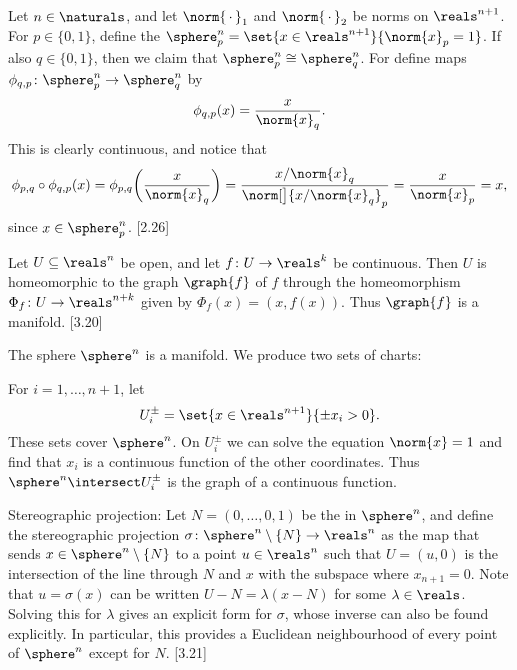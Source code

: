 \documentclass[article, a4paper, 11pt, oneside]{memoir}
\numberwithin{equation}{chapter}
\begin{document}
\begin{example}
    Let $n \in \naturals$, and let $\norm{\,\cdot\,}_1$ and $\norm{\,\cdot\,}_2$ be norms on $\reals^{n+1}$. For $p \in \{0,1\}$, define the  $\sphere^n_p = \set{x \in \reals^{n+1}}{\norm{x}_p = 1}$. If also $q \in \{0,1\}$, then we claim that $\sphere^n_p \cong \sphere^n_q$. For define maps $\phi_{q,p} \colon \sphere^n_p \to \sphere^n_q$ by
    \begin{equation*}
        \phi_{q,p}(x) = \frac{x}{\norm{x}_q}.
    \end{equation*}
    This is clearly continuous, and notice that
    \begin{equation*}
        \phi_{p,q} \circ \phi_{q,p}(x)
            = \phi_{p,q} \biggl( \frac{x}{\norm{x}_q} \biggr)
            = \frac{ x / \norm{x}_q }{ \norm[\big]{ x / \norm{x}_q }_p }
            = \frac{ x }{ \norm{ x }_p }
            = x,
    \end{equation*}
    since $x \in \sphere^n_p$.
    [2.26]
\end{example}


\begin{example}
    Let $U \subseteq \reals^n$ be open, and let $f \colon U \to \reals^k$ be continuous. Then $U$ is homeomorphic to the graph $\graph{f}$ of $f$ through the homeomorphism $\Phi_f \colon U \to \reals^{n+k}$ given by $\Phi_f(x) = (x, f(x))$. Thus $\graph{f}$ is a manifold. [3.20]
\end{example}


\begin{example}
    The sphere $\sphere^n$ is a manifold. We produce two sets of charts:

    For $i = 1, \ldots, n+1$, let
    \begin{equation*}
        U_i^\pm = \set{x \in \reals^{n+1}}{{\pm x_i} > 0}.
    \end{equation*}
    These sets cover $\sphere^n$. On $U_i^\pm$ we can solve the equation $\norm{x} = 1$ and find that $x_i$ is a continuous function of the other coordinates. Thus $\sphere^n \intersect U_i^\pm$ is the graph of a continuous function.

    Stereographic projection: Let $N = (0, \ldots, 0, 1)$ be the  in $\sphere^n$, and define the stereographic projection $\sigma \colon \sphere^n \setminus \{N\} \to \reals^n$ as the map that sends $x \in \sphere^n \setminus \{N\}$ to a point $u \in \reals^n$ such that $U = (u,0)$ is the intersection of the line through $N$ and $x$ with the subspace where $x_{n+1} = 0$. Note that $u = \sigma(x)$ can be written $U - N = \lambda (x - N)$ for some $\lambda \in \reals$. Solving this for $\lambda$ gives an explicit form for $\sigma$, whose inverse can also be found explicitly. In particular, this provides a Euclidean neighbourhood of every point of $\sphere^n$ except for $N$. [3.21]
\end{example}
\end{document}
